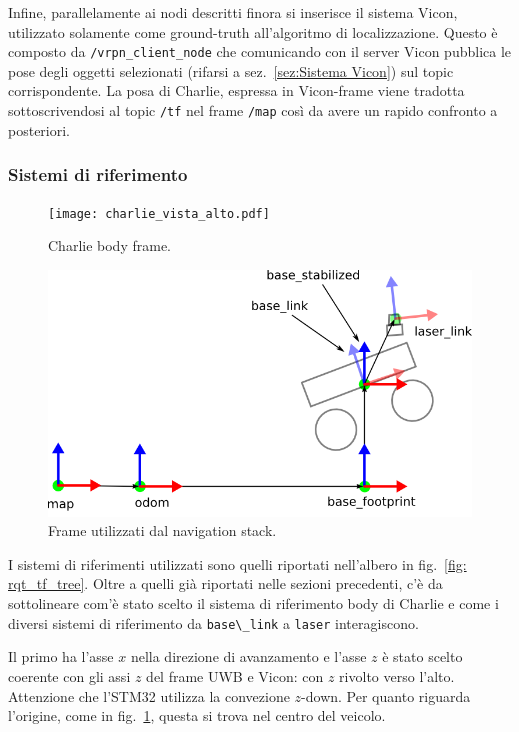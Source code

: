 \vspace{0.5mm}
Infine, parallelamente ai nodi descritti finora si inserisce il sistema Vicon, utilizzato solamente come ground-truth all'algoritmo di localizzazione. 
Questo \`e composto da \verb|/vrpn_client_node| che comunicando con il server Vicon pubblica le pose degli oggetti selezionati (rifarsi a sez.~\ref{sez:Sistema Vicon}) sul topic corrispondente. 
La posa di Charlie, espressa in Vicon-frame viene tradotta sottoscrivendosi al topic \verb|/tf| nel frame \verb|/map| cos\`i da avere un rapido confronto a posteriori.


\subsubsection{Sistemi di riferimento}
\begin{figure}[h]
	\centering
	\texttt{[image: charlie\_vista\_alto.pdf]}
	\caption{Charlie body frame.}
	\label{fig: charlie body frame}
\end{figure}

\begin{figure}[h]
	\centering
	\includegraphics[height=0.25\textheight]{coordsystems_hector.png}
	\caption{Frame utilizzati dal navigation stack.}
	\label{fig: hector frames}
\end{figure}

I sistemi di riferimenti utilizzati sono quelli riportati nell'albero in fig.~\ref{fig: rqt_tf_tree}. 
Oltre a quelli gi\`a riportati nelle sezioni precedenti, c'\`e da sottolineare com'\`e stato scelto il sistema di riferimento body di Charlie e come i diversi sistemi di riferimento da \verb|base\_link| a \verb|laser| interagiscono.

Il primo ha l'asse $x$ nella direzione di avanzamento e l'asse $z$ \`e stato scelto coerente con gli assi $z$ del frame UWB e Vicon: con $z$ rivolto verso l'alto. Attenzione che l'STM32 utilizza la convezione $z$-down. Per quanto riguarda l'origine, come in fig.~\ref{fig: charlie body frame}, questa si trova nel centro del veicolo.

